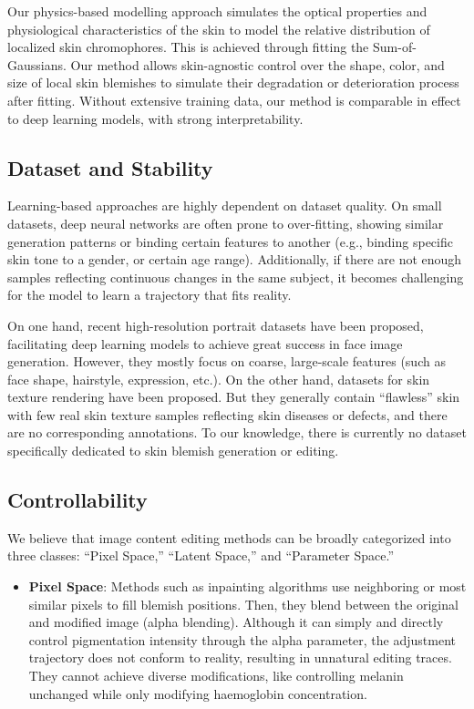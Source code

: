 \begin{spacing}{1.5}
Our physics-based modelling approach simulates the optical properties and physiological characteristics of the skin to model the relative distribution of localized skin chromophores. This is achieved through fitting the Sum-of-Gaussians. Our method allows skin-agnostic control over the shape, color, and size of local skin blemishes to simulate their degradation or deterioration process after fitting. Without extensive training data, our method is comparable in effect to deep learning models, with strong interpretability.

\subsection{Dataset and Stability}

Learning-based approaches are highly dependent on dataset quality. On small datasets, deep neural networks are often prone to over-fitting, showing similar generation patterns or binding certain features to another (e.g., binding specific skin tone to a gender, or certain age range). Additionally, if there are not enough samples reflecting continuous changes in the same subject, it becomes challenging for the model to learn a trajectory that fits reality.

On one hand, recent high-resolution portrait datasets\cite{DBLP:journals/corr/abs-1812-04948} have been proposed, facilitating deep learning models to achieve great success in face image generation. However, they mostly focus on coarse, large-scale features (such as face shape, hairstyle, expression, etc.). On the other hand, datasets for skin texture rendering\cite{Bai_2023_CVPR} have been proposed. But they generally contain “flawless” skin with few real skin texture samples reflecting skin diseases or defects, and there are no corresponding annotations. To our knowledge, there is currently no dataset specifically dedicated to skin blemish generation or editing.

\subsection{Controllability}
We believe that image content editing methods can be broadly categorized into three classes: “Pixel Space,” “Latent Space,” and “Parameter Space.”
\begin{itemize}
    \item \textbf{Pixel Space}: Methods such as inpainting algorithms use neighboring or most similar pixels to fill blemish positions\cite{doi:10.1080/10867651.2004.10487596, bertalmio2001navier}. Then, they blend between the original and modified image (alpha blending). Although it can simply and directly control pigmentation intensity through the alpha parameter, the adjustment trajectory does not conform to reality, resulting in unnatural editing traces. They cannot achieve diverse modifications, like controlling melanin unchanged while only modifying haemoglobin concentration.


\end{itemize}
\end{spacing}
